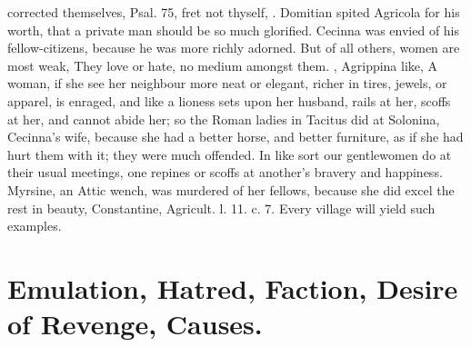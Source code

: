 {{corrected themselves, Psal. 75, fret not thyself, \etc{}. Domitian spited
Agricola for his worth, that a private man should be so much
glorified. Cecinna was envied of his fellow-citizens, because he
was more richly adorned. But of all others, women are most weak,
 They love or hate, no medium amongst
them. , Agrippina like, A
woman, if she see her neighbour more neat or elegant, richer in tires,
jewels, or apparel, is enraged, and like a lioness sets upon her
husband, rails at her, scoffs at her, and cannot abide her; so the
Roman ladies in Tacitus did at Solonina, Cecinna's wife, because
she had a better horse, and better furniture, as if she had hurt them
with it; they were much offended. In like sort our gentlewomen do at
their usual meetings, one repines or scoffs at another's bravery and
happiness. Myrsine, an Attic wench, was murdered of her fellows, 
because she did excel the rest in beauty, Constantine, Agricult. l. 11.
c. 7. Every village will yield such examples.

\section{Emulation, Hatred, Faction, Desire of Revenge, Causes.}

}}
